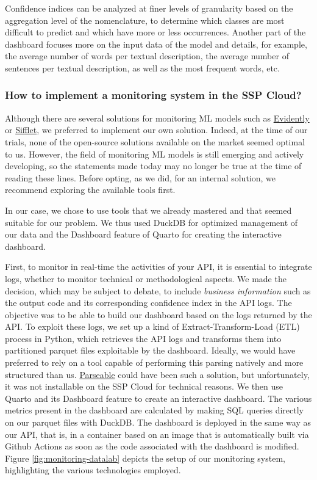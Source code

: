 Confidence indices can be analyzed at finer levels of granularity based on the aggregation level of the nomenclature, to determine which classes are most difficult to predict and which have more or less occurrences. Another part of the dashboard focuses more on the input data of the model and details, for example, the average number of words per textual description, the average number of sentences per textual description, as well as the most frequent words, etc.

\subsubsection{How to implement a monitoring system in the SSP Cloud?}

Although there are several solutions for monitoring ML models such as \href{https://www.evidentlyai.com/}{Evidently} or \href{https://www.siffletdata.com/}{Sifflet}, we preferred to implement our own solution. Indeed, at the time of our trials, none of the open-source solutions available on the market seemed optimal to us. However, the field of monitoring ML models is still emerging and actively developing, so the statements made today may no longer be true at the time of reading these lines. Before opting, as we did, for an internal solution, we recommend exploring the available tools first.

In our case, we chose to use tools that we already mastered and that seemed suitable for our problem. We thus used DuckDB for optimized management of our data and the Dashboard feature of Quarto for creating the interactive dashboard. 

First, to monitor in real-time the activities of your API, it is essential to integrate logs, whether to monitor technical or methodological aspects. We made the decision, which may be subject to debate, to include \textit{business information} such as the output code and its corresponding confidence index in the API logs. The objective was to be able to build our dashboard based on the logs returned by the API. To exploit these logs, we set up a kind of Extract-Transform-Load (ETL) process in Python, which retrieves the API logs and transforms them into partitioned parquet files exploitable by the dashboard. Ideally, we would have preferred to rely on a tool capable of performing this parsing natively and more structured than us. \href{https://www.parseable.com/}{Parseable} could have been such a solution, but unfortunately, it was not installable on the SSP Cloud for technical reasons. We then use Quarto and its Dashboard feature to create an interactive dashboard. The various metrics present in the dashboard are calculated by making SQL queries directly on our parquet files with DuckDB. The dashboard is deployed in the same way as our API, that is, in a container based on an image that is automatically built via Github Actions as soon as the code associated with the dashboard is modified. Figure \ref{fig:monitoring-datalab} depicts the setup of our monitoring system, highlighting the various technologies employed.

